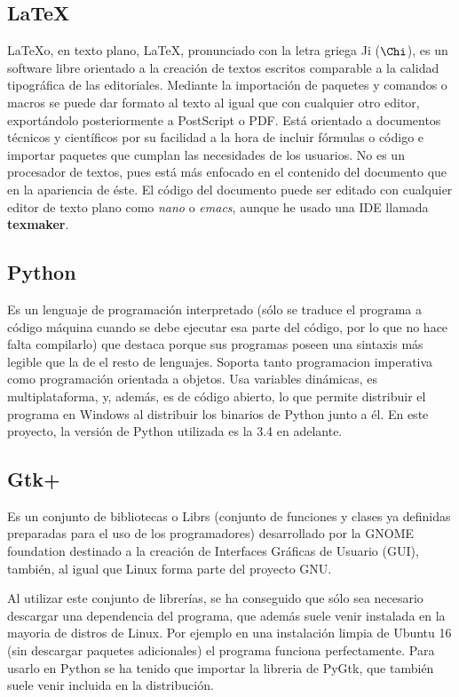 \documentclass[a4paper, 11pt]{report} %
\begin{document}
\subsection{LaTeX}
\LaTeX\space o, en texto plano, LaTeX, pronunciado con la letra griega 
Ji ($\Chi$), es un software libre orientado a la creación de textos escritos comparable a la calidad tipográfica de las editoriales. Mediante la importación de paquetes y comandos o macros se puede dar formato al texto al igual que con cualquier otro editor, exportándolo posteriormente a PostScript o PDF. Está orientado a documentos técnicos y científicos por su facilidad a la hora de incluir fórmulas o código e importar paquetes que cumplan las necesidades de los usuarios. No es un procesador de textos, pues está más enfocado en el contenido del documento que en la apariencia de éste.
El código del documento puede ser editado con cualquier editor de texto plano como \textit{nano} o \textit{emacs}, aunque he usado una \acrshort{IDE} llamada \textbf{texmaker}.

\subsection{Python}
\label{python}
Es un lenguaje de programación interpretado (sólo se traduce  el programa a código máquina cuando se debe ejecutar esa parte del código, por lo que no hace falta compilarlo) que destaca porque sus programas poseen una sintaxis más legible que la de el resto de lenguajes. Soporta tanto \gls{programacion imperativa} como programación orientada a objetos. Usa variables dinámicas, es multiplataforma, y, además, es de código abierto, lo que permite distribuir el programa en Windows al distribuir los binarios de Python junto a él. En este proyecto, la versión de Python utilizada es la 3.4 en adelante.

\subsection{Gtk+}
Es un conjunto de bibliotecas o \glspl{Libr} (conjunto de funciones y clases ya definidas preparadas para el uso de los programadores) desarrollado por la GNOME foundation destinado a la creación de Interfaces Gráficas de Usuario (\acrshort{GUI}), también, al igual que Linux forma parte del proyecto GNU.

Al utilizar este conjunto de librerías, se ha conseguido que sólo sea necesario descargar una dependencia del programa, que además suele venir instalada en la mayoria de distros de Linux. Por ejemplo en una instalación limpia de Ubuntu 16 (sin descargar paquetes adicionales) el programa funciona perfectamente. Para usarlo en Python se ha tenido que importar la libreria de PyGtk, que también suele venir incluida en la distribución.
\end{document}
